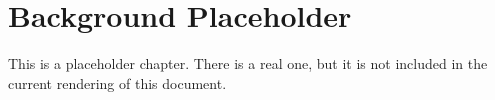\chapter{Background Placeholder}
\label{chap:Background}

This is a placeholder chapter. There is a real one, but it is not included in the current rendering of this document.